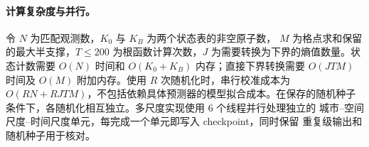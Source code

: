 \paragraph{计算复杂度与并行。}
令 \(N\) 为匹配观测数，\(K_0\) 与 \(K_B\) 为两个状态表的非空原子数，
\(M\) 为格点求和保留的最大半支撑，\(T\leq200\) 为根函数计算次数，\(J\)
为需要转换为下界的熵值数量。状态计数需要 \(O(N)\) 时间和
\(O(K_0+K_B)\) 内存；直接下界转换需要 \(O(JTM)\) 时间及 \(O(M)\)
附加内存。使用 \(R\) 次随机化时，串行校准成本为
\(O(RN+RJTM)\)，不包括依赖具体预测器的模型拟合成本。在保存的随机种子
条件下，各随机化相互独立。多尺度实现使用 6 个线程并行处理独立的
城市--空间尺度--时间尺度单元，每完成一个单元即写入 checkpoint，同时保留
重复级输出和随机种子用于核对。
